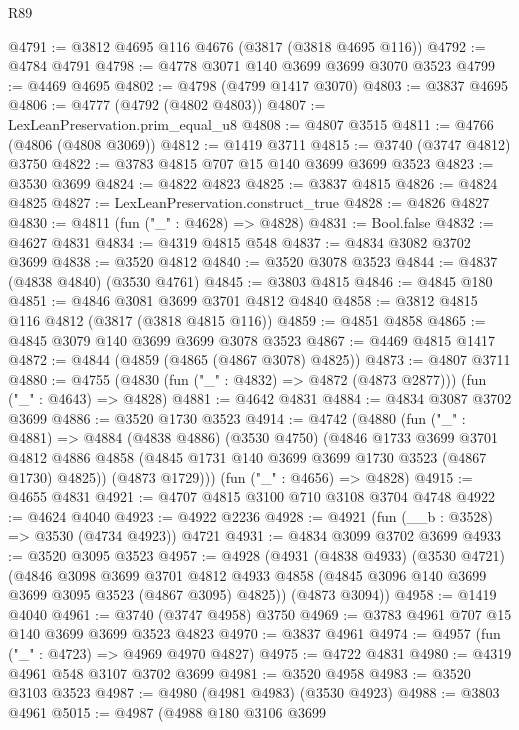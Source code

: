 \begin{lexlean}{R89}
\begin{coremodule}
@4791 := @3812 @4695 @116 @4676 (@3817 (@3818 @4695 @116))
@4792 := @4784 @4791
@4798 := @4778 @3071 @140 @3699 @3699 @3070 @3523
@4799 := @4469 @4695
@4802 := @4798 (@4799 @1417 @3070)
@4803 := @3837 @4695
@4806 := @4777 (@4792 (@4802 @4803))
@4807 := LexLeanPreservation.prim_equal_u8
@4808 := @4807 @3515
@4811 := @4766 (@4806 (@4808 @3069))
@4812 := @1419 @3711
@4815 := @3740 (@3747 @4812) @3750
@4822 := @3783 @4815 @707 @15 @140 @3699 @3699 @3523
@4823 := @3530 @3699
@4824 := @4822 @4823
@4825 := @3837 @4815
@4826 := @4824 @4825
@4827 := LexLeanPreservation.construct_true
@4828 := @4826 @4827
@4830 := @4811 (fun ("_" : @4628) => @4828)
@4831 := Bool.false
@4832 := @4627 @4831
@4834 := @4319 @4815 @548
@4837 := @4834 @3082 @3702 @3699
@4838 := @3520 @4812
@4840 := @3520 @3078 @3523
@4844 := @4837 (@4838 @4840) (@3530 @4761)
@4845 := @3803 @4815
@4846 := @4845 @180
@4851 := @4846 @3081 @3699 @3701 @4812 @4840
@4858 := @3812 @4815 @116 @4812 (@3817 (@3818 @4815 @116))
@4859 := @4851 @4858
@4865 := @4845 @3079 @140 @3699 @3699 @3078 @3523
@4867 := @4469 @4815 @1417
@4872 := @4844 (@4859 (@4865 (@4867 @3078) @4825))
@4873 := @4807 @3711
@4880 := @4755 (@4830 (fun ("_" : @4832) => @4872 (@4873 @2877))) (fun ("_" : @4643) => @4828)
@4881 := @4642 @4831
@4884 := @4834 @3087 @3702 @3699
@4886 := @3520 @1730 @3523
@4914 := @4742
    (@4880
      (fun ("_" : @4881) =>
      @4884
        (@4838 @4886)
        (@3530 @4750)
        (@4846
          @1733
          @3699
          @3701
          @4812
          @4886
          @4858
          (@4845 @1731 @140 @3699 @3699 @1730 @3523 (@4867 @1730) @4825))
        (@4873 @1729)))
    (fun ("_" : @4656) => @4828)
@4915 := @4655 @4831
@4921 := @4707 @4815 @3100 @710 @3108 @3704 @4748
@4922 := @4624 @4040
@4923 := @4922 @2236
@4928 := @4921 (fun (__b : @3528) => @3530 (@4734 @4923)) @4721
@4931 := @4834 @3099 @3702 @3699
@4933 := @3520 @3095 @3523
@4957 := @4928
    (@4931
      (@4838 @4933)
      (@3530 @4721)
      (@4846
        @3098
        @3699
        @3701
        @4812
        @4933
        @4858
        (@4845 @3096 @140 @3699 @3699 @3095 @3523 (@4867 @3095) @4825))
      (@4873 @3094))
@4958 := @1419 @4040
@4961 := @3740 (@3747 @4958) @3750
@4969 := @3783 @4961 @707 @15 @140 @3699 @3699 @3523 @4823
@4970 := @3837 @4961
@4974 := @4957 (fun ("_" : @4723) => @4969 @4970 @4827)
@4975 := @4722 @4831
@4980 := @4319 @4961 @548 @3107 @3702 @3699
@4981 := @3520 @4958
@4983 := @3520 @3103 @3523
@4987 := @4980 (@4981 @4983) (@3530 @4923)
@4988 := @3803 @4961
@5015 := @4987
    (@4988
      @180
      @3106
      @3699

\end{coremodule}
\end{lexlean}
